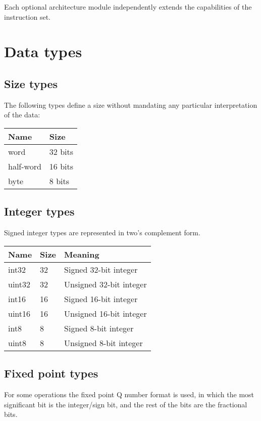 Each optional architecture module independently extends the capabilities of the
instruction set.

\section{Data types}

\subsection{Size types}

The following types define a size without mandating any particular
interpretation of the data:

\begin{tabular}{|l|l|}
  \hline
  \textbf{Name} & \textbf{Size} \\
  \hline
  word & 32 bits \\
  \hline
  half-word & 16 bits \\
  \hline
  byte & 8 bits \\
  \hline
\end{tabular}

\subsection{Integer types}

Signed integer types are represented in two's complement form.

\begin{tabular}{|l|l|l|}
  \hline
  \textbf{Name} & \textbf{Size} & \textbf{Meaning} \\
  \hline
  int32 & 32 & Signed 32-bit integer \\
  \hline
  uint32 & 32 & Unsigned 32-bit integer \\
  \hline
  int16 & 16 & Signed 16-bit integer \\
  \hline
  uint16 & 16 & Unsigned 16-bit integer \\
  \hline
  int8 & 8 & Signed 8-bit integer \\
  \hline
  uint8 & 8 & Unsigned 8-bit integer \\
  \hline
\end{tabular}

\subsection{Fixed point types}

For some operations the fixed point Q number format is used, in which the most
significant bit is the integer/sign bit, and the rest of the bits are the
fractional bits.

